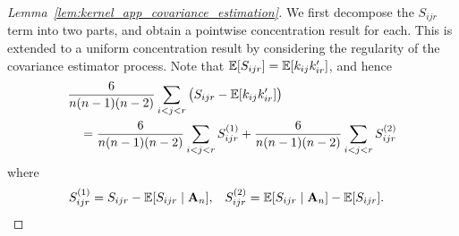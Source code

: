 \begin{proof}[Lemma~\ref{lem:kernel_app_covariance_estimation}]

  We first decompose the $S_{i j r}$ term into two parts,
  and obtain a pointwise concentration result for each.
  This is extended to a uniform concentration result
  by considering the regularity of the covariance estimator process.
  Note that
  $\mathbb{E}[S_{i j r}] = \mathbb{E}[k_{i j} k_{i r}']$,
  and hence
  \begin{align*}
    &\frac{6}{n(n-1)(n-2)}
    \sum_{i<j<r}
    \big(
      S_{i j r}
      - \mathbb{E}[k_{i j} k_{i r}']
    \big) \\
    &\quad=
    \frac{6}{n(n-1)(n-2)}
    \sum_{i<j<r}
    S_{i j r}^{(1)}
    + \frac{6}{n(n-1)(n-2)}
    \sum_{i<j<r}
    S_{i j r}^{(2)}
  \end{align*}
  where
  \begin{align*}
    S_{i j r}^{(1)}
    &=
    S_{i j r} -
    \mathbb{E}[S_{i j r} \mid \mathbf{A}_n],
    &S_{i j r}^{(2)}
    &=
    \mathbb{E}[S_{i j r} \mid \mathbf{A}_n]
    - \mathbb{E}[S_{i j r}].
  \end{align*}



\end{proof}
